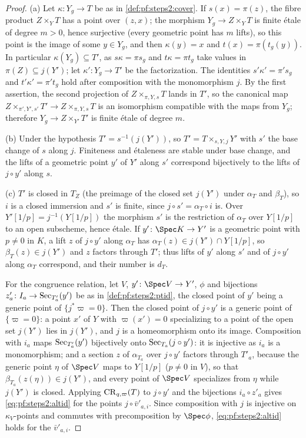 \begin{proof}
(a) Let $\kappa\colon Y_g\to T$ be as in \cref{def:pf:steps2:cover}. If $s(x)=\pi(z)$, the fibre
product $Z\times_YT$ has a point over $(z,x)$; the morphism $Y_g\to Z\times_YT$ is finite \'etale of
degree $m>0$, hence surjective (every geometric point has $m$ lifts), so this point is the image of
some $y\in Y_g$, and then $\kappa(y)=x$ and $t(x)=\pi(t_g(y))$. In particular $\kappa(Y_g)\subseteq
T'$, as $s\kappa=\pi s_g$ and $t\kappa=\pi t_g$ take values in $\pi(Z)\subseteq j(Y')$; let
$\kappa'\colon Y_g\to T'$ be the factorization. The identities $s'\kappa'=\pi's_g$ and
$t'\kappa'=\pi't_g$ hold after composition with the monomorphism $j$. By the first assertion, the
second projection of $Z\times_{\pi,Y,s}T$ lands in $T'$, so the canonical map
$Z\times_{\pi',Y',s'}T'\to Z\times_{\pi,Y,s}T$ is an isomorphism compatible with the maps from $Y_g$;
therefore $Y_g\to Z\times_{Y'}T'$ is finite \'etale of degree $m$.

(b) Under the hypothesis $T'=s^{-1}(j(Y'))$, so $T'=T\times_{s,Y,j}Y'$ with $s'$ the base change of
$s$ along $j$. Finiteness and \'etaleness are stable under base change, and the lifts of a
geometric point $y'$ of $Y'$ along $s'$ correspond bijectively to the lifts of $j\circ y'$ along $s$.

(c) $T'$ is closed in $T_Z$ (the preimage of the closed set $j(Y')$ under $\alpha_T$ and $\beta_T$),
so $i$ is a closed immersion and $s'$ is finite, since $j\circ s'=\alpha_T\circ i$ is. Over
$Y'[1/p]=j^{-1}(Y[1/p])$ the morphism $s'$ is the restriction of $\alpha_T$ over $Y[1/p]$ to an open
subscheme, hence \'etale. If $y'\colon\Spec K\to Y'$ is a geometric point with $p\ne0$ in $K$, a lift
$z$ of $j\circ y'$ along $\alpha_T$ has $\alpha_T(z)\in j(Y')\cap Y[1/p]$, so $\beta_T(z)\in j(Y')$
and $z$ factors through $T'$; thus lifts of $y'$ along $s'$ and of $j\circ y'$ along $\alpha_T$
correspond, and their number is $d_T$.

For the congruence relation, let $V$, $y'\colon\Spec V\to Y'$, $\phi$ and bijections
$z'_a\colon I_a\to\mathrm{Sec}_{T'_a}(y')$ be as in \cref{def:pf:steps2:ptid}, the closed point of $y'$
being a generic point of $\{j^\ast\varpi=0\}$. Then the closed point of $j\circ y'$ is a generic point
of $\{\varpi=0\}$: a point $x'$ of $Y$ with $\varpi(x')=0$ specializing to a point of the open set
$j(Y')$ lies in $j(Y')$, and $j$ is a homeomorphism onto its image. Composition with $i_a$ maps
$\mathrm{Sec}_{T'_a}(y')$ bijectively onto $\mathrm{Sec}_{T_a}(j\circ y')$: it is injective as $i_a$ is a
monomorphism; and a section $z$ of $\alpha_{T_a}$ over $j\circ y'$ factors through $T'_a$, because
the generic point $\eta$ of $\Spec V$ maps to $Y[1/p]$ ($p\ne0$ in $V$), so that
$\beta_{T_a}(z(\eta))\in j(Y')$, and every point of $\Spec V$ specializes from $\eta$ while $j(Y')$ is
closed. Applying $\mathrm{CR}_{q,\varpi}(T)$ to $j\circ y'$ and the bijections $i_a\circ z'_a$ gives
\eqref{eq:pf:steps2:altid} for the points $j\circ\bar v'_{a,i}$. Since composition with $j$ is
injective on $\kappa_V$-points and commutes with precomposition by $\Spec\phi$,
\eqref{eq:pf:steps2:altid} holds for the $\bar v'_{a,i}$.
\end{proof}

